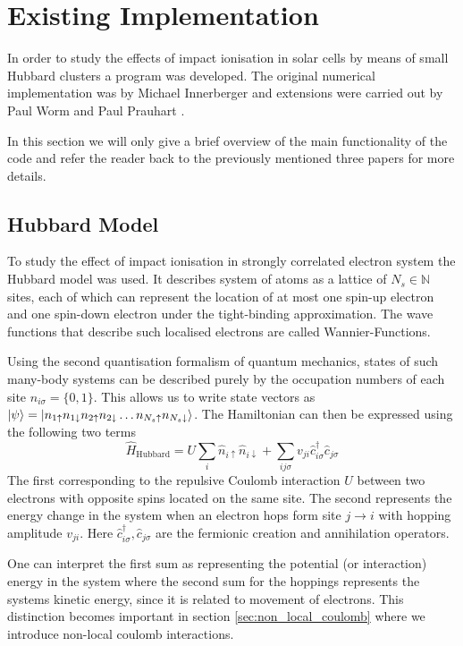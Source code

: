 \section{Existing Implementation}
In order to study the effects of impact ionisation in solar cells by means of small Hubbard clusters a program was developed. The original numerical implementation was by Michael Innerberger \cite{innerberger} and extensions were carried out by Paul Worm \cite{worm_bachelor, worm_project} and Paul Prauhart \cite{prauhart}.
\medskip

In this section we will only give a brief overview of the main functionality of the code and refer the reader back to the previously mentioned three papers for more details.

\subsection{Hubbard Model} \label{sec:hubbard_model}
To study the effect of impact ionisation in strongly correlated electron system the Hubbard model was used. It describes system of atoms as a lattice of $N_s\in \mathbb{N}$ sites, each of which can represent the location of at most one spin-up electron and one spin-down electron under the tight-binding approximation. The wave functions that describe such localised electrons are called Wannier-Functions.
\medskip

Using the second quantisation formalism of quantum mechanics, states of such many-body systems can be described purely by the occupation numbers of each site $n_{i\sigma} = \{0,1\}$. This allows us to write state vectors as $\ket{\psi}= \ket{n_{1\uparrow}n_{1\downarrow} n_{2\uparrow}n_{2\downarrow}\dots n_{N_{s}\uparrow}n_{N_{s}\downarrow}}$. The Hamiltonian can then be expressed using the following two terms
\begin{equation}
    \hat{H}_{\text{Hubbard}} = U \sum_i \hat{n}_{i\uparrow} \hat{n}_{i\downarrow} + \sum_{ij\sigma} v_{ji} \hat{c}^\dagger_{i\sigma} \hat{c}_{j\sigma}\label{eq:hubbard_hamiltonian}
\end{equation}
The first corresponding to the repulsive Coulomb interaction $U$ between two electrons with opposite spins located on the same site. The second represents the energy change in the system when an electron hops form site $j\to i$ with hopping amplitude $v_{ji}$. Here $\hat{c}_{i\sigma}^\dagger, \hat{c}_{j\sigma}$ are the fermionic creation and annihilation operators.
\medskip

One can interpret the first sum as representing the potential (or interaction) energy in the system where the second sum for the hoppings represents the systems kinetic energy, since it is related to movement of electrons. This distinction becomes important in section \ref{sec:non_local_coulomb} where we introduce non-local coulomb interactions.



